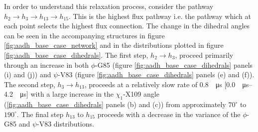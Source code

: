 In order to understand this relaxation process, consider the pathway $h_{2}\rightarrow h_{3} \rightarrow h_{13} \rightarrow h_{15}$. This is the highest flux pathway i.e. the pathway which at each point selects the highest flux connection. The change in the dihedral angles can be seen in the accompanying structures in figure \ref{fig:aadh_base_case_network} and in the distributions plotted in figure \ref{fig:aadh_base_case_dihedrals}.
 The first step, $h_2 \rightarrow h_{3}$, proceed primarily through an increase in both $\phi$-G85 (figure \ref{fig:aadh_base_case_dihedrals} panels (i) and (j)) and $\psi$-V83 (figure \ref{fig:aadh_base_case_dihedrals} panels (e) and (f)). The second step, $h_{3} \rightarrow h_{13}$, proceeds at a relatively slow rate of  \SI{0.8}{\per\micro\second} [\SIrange[range-phrase=-]{0.0}{4.2}{\per\micro\second}] with a large increase in the $\chi_1$-X109 angle (\ref{fig:aadh_base_case_dihedrals} panels (b) and (c)) from approximately $70^{\circ}$ to $190^{\circ}$. The final step $h_{13}$ to $h_{15}$ proceeds with a decrease in the variance of the $\phi$-G85 and $\psi$-V83 distributions.

